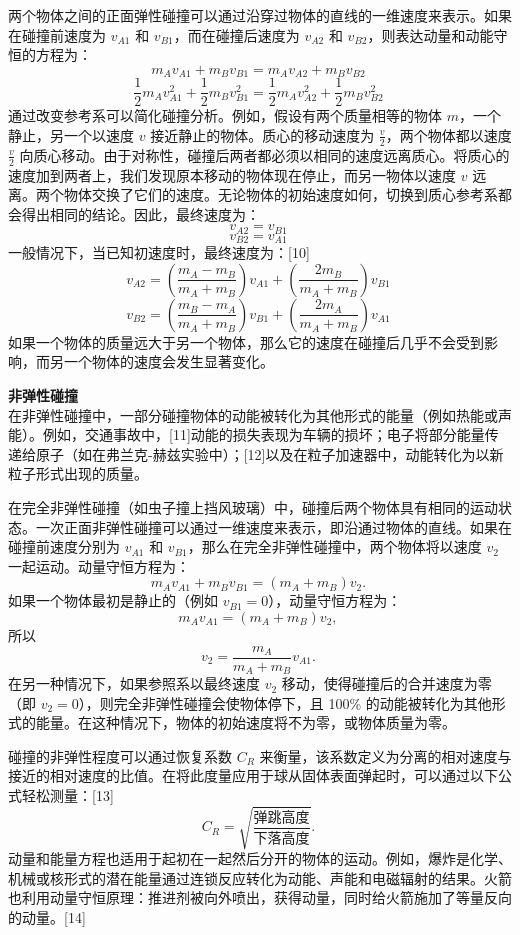 两个物体之间的正面弹性碰撞可以通过沿穿过物体的直线的一维速度来表示。如果在碰撞前速度为 \( v_{A1} \) 和 \( v_{B1} \)，而在碰撞后速度为 \( v_{A2} \) 和 \( v_{B2} \)，则表达动量和动能守恒的方程为：
\[
m_{A}v_{A1} + m_{B}v_{B1} = m_{A}v_{A2} + m_{B}v_{B2}~
\]
\[
\frac{1}{2} m_{A} v_{A1}^2 + \frac{1}{2} m_{B} v_{B1}^2 = \frac{1}{2} m_{A} v_{A2}^2 + \frac{1}{2} m_{B} v_{B2}^2~
\]
通过改变参考系可以简化碰撞分析。例如，假设有两个质量相等的物体 \( m \)，一个静止，另一个以速度 \( v \) 接近静止的物体。质心的移动速度为 \( \frac{v}{2} \)，两个物体都以速度 \( \frac{v}{2} \) 向质心移动。由于对称性，碰撞后两者都必须以相同的速度远离质心。将质心的速度加到两者上，我们发现原本移动的物体现在停止，而另一物体以速度 \( v \) 远离。两个物体交换了它们的速度。无论物体的初始速度如何，切换到质心参考系都会得出相同的结论。因此，最终速度为：
\[
v_{A2} = v_{B1}~
\]
\[
v_{B2} = v_{A1}~
\]
一般情况下，当已知初速度时，最终速度为：[10]
\[
v_{A2} = \left( \frac{m_{A} - m_{B}}{m_{A} + m_{B}} \right) v_{A1} + \left( \frac{2 m_{B}}{m_{A} + m_{B}} \right) v_{B1}~
\]
\[
v_{B2} = \left( \frac{m_{B} - m_{A}}{m_{A} + m_{B}} \right) v_{B1} + \left( \frac{2 m_{A}}{m_{A} + m_{B}} \right) v_{A1}~
\]
如果一个物体的质量远大于另一个物体，那么它的速度在碰撞后几乎不会受到影响，而另一个物体的速度会发生显著变化。

\textbf{非弹性碰撞}\\
在非弹性碰撞中，一部分碰撞物体的动能被转化为其他形式的能量（例如热能或声能）。例如，交通事故中，[11]动能的损失表现为车辆的损坏；电子将部分能量传递给原子（如在弗兰克-赫兹实验中）；[12]以及在粒子加速器中，动能转化为以新粒子形式出现的质量。

在完全非弹性碰撞（如虫子撞上挡风玻璃）中，碰撞后两个物体具有相同的运动状态。一次正面非弹性碰撞可以通过一维速度来表示，即沿通过物体的直线。如果在碰撞前速度分别为 \(v_{A1}\) 和 \(v_{B1}\)，那么在完全非弹性碰撞中，两个物体将以速度 \(v_2\) 一起运动。动量守恒方程为：
\[
m_A v_{A1} + m_B v_{B1} = (m_A + m_B)v_2.~
\]
如果一个物体最初是静止的（例如 \(v_{B1} = 0\)），动量守恒方程为：
\[
m_A v_{A1} = (m_A + m_B) v_2,~
\]
所以
\[
v_2 = \frac{m_A}{m_A + m_B} v_{A1}.~
\]
在另一种情况下，如果参照系以最终速度 \(v_2\) 移动，使得碰撞后的合并速度为零（即 \(v_2 = 0\)），则完全非弹性碰撞会使物体停下，且 100\% 的动能被转化为其他形式的能量。在这种情况下，物体的初始速度将不为零，或物体质量为零。

碰撞的非弹性程度可以通过恢复系数 \(C_R\) 来衡量，该系数定义为分离的相对速度与接近的相对速度的比值。在将此度量应用于球从固体表面弹起时，可以通过以下公式轻松测量：[13]
\[
C_R = \sqrt{\frac{\text{弹跳高度}}{\text{下落高度}}}.~
\]
动量和能量方程也适用于起初在一起然后分开的物体的运动。例如，爆炸是化学、机械或核形式的潜在能量通过连锁反应转化为动能、声能和电磁辐射的结果。火箭也利用动量守恒原理：推进剂被向外喷出，获得动量，同时给火箭施加了等量反向的动量。[14]
